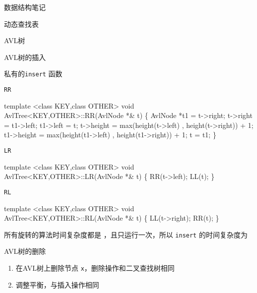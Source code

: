 \documentclass[
  ignorenonframetext,
]{beamer}
\newenvironment{Shaded}{}{}
\newcommand{\NormalTok}[1]{#1}
\providecommand{\tightlist}{%
  \setlength{\itemsep}{0pt}\setlength{\parskip}{0pt}}
\begin{document}
\begin{frame}[fragile]{数据结构笔记}
\begin{block}{动态查找表}
\begin{block}{AVL树}
\begin{block}{AVL树的插入}
\begin{block}{私有的\texttt{insert} 函数}
\begin{block}{\texttt{RR}}
\protect{}\label{rr}
\begin{Shaded}
\begin{Highlighting}[]
\NormalTok{template \textless{}class KEY,class OTHER\textgreater{}}
\NormalTok{void AvlTree\textless{}KEY,OTHER\textgreater{}::RR(AvlNode *\& t)}
\NormalTok{\{}
\NormalTok{  AvlNode *t1 = t{-}\textgreater{}right;}
\NormalTok{  t{-}\textgreater{}right = t1{-}\textgreater{}left;}
\NormalTok{  t1{-}\textgreater{}left = t;}
\NormalTok{  t{-}\textgreater{}height = max(height(t{-}\textgreater{}left) , height(t{-}\textgreater{}right)) + 1;}
\NormalTok{  t1{-}\textgreater{}height = max(height(t1{-}\textgreater{}left) , height(t1{-}\textgreater{}right)) + 1;}
\NormalTok{  t = t1;}
\NormalTok{\}}
\end{Highlighting}
\end{Shaded}
\end{block}

\begin{block}{\texttt{LR}}
\protect{}\label{lr}
\begin{Shaded}
\begin{Highlighting}[]
\NormalTok{template \textless{}class KEY,class OTHER\textgreater{}}
\NormalTok{void AvlTree\textless{}KEY,OTHER\textgreater{}::LR(AvlNode *\& t)}
\NormalTok{\{}
\NormalTok{  RR(t{-}\textgreater{}left);}
\NormalTok{  LL(t);}
\NormalTok{\}}
\end{Highlighting}
\end{Shaded}
\end{block}

\begin{block}{\texttt{RL}}
\protect{}\label{rl}
\begin{Shaded}
\begin{Highlighting}[]
\NormalTok{template \textless{}class KEY,class OTHER\textgreater{}}
\NormalTok{void AvlTree\textless{}KEY,OTHER\textgreater{}::RL(AvlNode *\& t)}
\NormalTok{\{}
\NormalTok{  LL(t{-}\textgreater{}right);}
\NormalTok{  RR(t);}
\NormalTok{\}}
\end{Highlighting}
\end{Shaded}

所有旋转的算法时间复杂度都是 {}，且只运行一次，所以 \texttt{insert}
的时间复杂度为 {}
\end{block}
\end{block}
\end{block}

\begin{block}{AVL树的删除}
\protect{}\label{avlux6811ux7684ux5220ux9664}
\begin{enumerate}
\tightlist
\item
  在AVL树上删除节点 \texttt{x}，删除操作和二叉查找树相同
\item
  调整平衡，与插入操作相同
\end{enumerate}
\end{block}


\end{block}
\end{block}
\end{frame}
\end{document}
